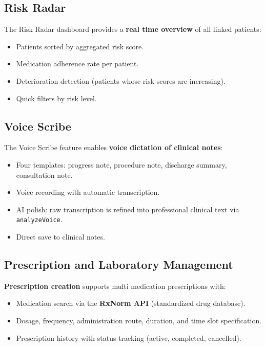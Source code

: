 \documentclass[12pt,a4paper,oneside]{report}
\begin{document}
\subsection{Risk Radar}

The Risk Radar dashboard provides a \textbf{real time overview} of all linked patients:

\begin{itemize}
    \item Patients sorted by aggregated risk score.
    \item Medication adherence rate per patient.
    \item Deterioration detection (patients whose risk scores are increasing).
    \item Quick filters by risk level.
\end{itemize}

\subsection{Voice Scribe}

The Voice Scribe feature enables \textbf{voice dictation of clinical notes}:

\begin{itemize}
    \item Four templates: progress note, procedure note, discharge summary, consultation note.
    \item Voice recording with automatic transcription.
    \item AI polish: raw transcription is refined into professional clinical text via \texttt{analyzeVoice}.
    \item Direct save to clinical notes.
\end{itemize}

\subsection{Prescription and Laboratory Management}

\textbf{Prescription creation} supports multi medication prescriptions with:

\begin{itemize}
    \item Medication search via the \textbf{RxNorm API} (standardized drug database).
    \item Dosage, frequency, administration route, duration, and time slot specification.
    \item Prescription history with status tracking (active, completed, cancelled).
\end{itemize}
\end{document}
